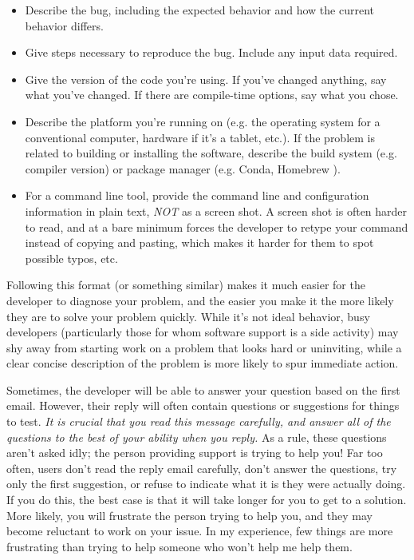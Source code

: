 \documentclass[9pt,training,ASAPversion]{livecoms}
\begin{document}
\begin{itemize}

    \item Describe the bug, including the expected behavior and how the current
    behavior differs.

    \item Give steps necessary to reproduce the bug. Include any input data
    required.

    \item Give the version of the code you're using. If you've changed anything,
    say what you've changed. If there are compile-time options, say what you
    chose.

    \item Describe the platform you're running on (e.g. the operating system for
    a conventional computer, hardware if it's a tablet, etc.). If the problem is
    related to building or installing the software, describe the build system
    (e.g. compiler version) or package manager (e.g. Conda\cite{CONDA}, Homebrew \cite{HOMEBREW}).

    \item For a command line tool, provide the command line and configuration
    information in plain text, \emph{NOT} as a screen shot. A screen shot is
    often harder to read, and at a bare minimum forces the developer to retype
    your command instead of copying and pasting, which makes it harder for them
    to spot possible typos, etc.

\end{itemize}

Following this format (or something similar) makes it much easier for the
developer to diagnose your problem, and the easier you make it the more likely
they are to solve your problem quickly. While it's not ideal behavior, busy
developers (particularly those for whom software support is a side activity) may
shy away from starting work on a problem that looks hard or uninviting, while a
clear concise description of the problem is more likely to spur immediate
action.

Sometimes, the developer will be able to answer your question based on the first
email. However, their reply will often contain questions or suggestions for
things to test. \emph{It is crucial that you read this message carefully, and
answer all of the questions to the best of your ability when you reply.} As a
rule, these questions aren't asked idly; the person providing support is trying
to help you! Far too often, users don't read the reply email carefully, don't
answer the questions, try only the first suggestion, or refuse to indicate what
it is they were actually doing. If you do this, the best case is that it will
take longer for you to get to a solution. More likely, you will frustrate the
person trying to help you, and they may become reluctant to work on your issue.
In my experience, few things are more frustrating than trying to help someone
who won't help me help them.
\end{document}
